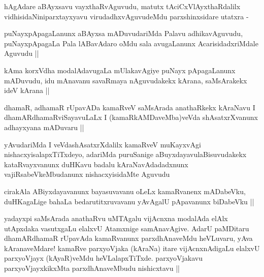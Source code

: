 \begin{artha}
hAgAdare aBAyxsavu vayxthaRvAguvudu, matutx tAciCxVlAyxthaRdalilx
vidhisidaNiniparxtayxyavu virudadhxvAguvudeMdu parxshinxsidare utatxra -
\end{artha}

\begin{artha}
puNayxpApagaLanunx aBAyxsa mADuvudariMda Palavu adhikavAguvudu,
puNayxpApagaLa Pala lABavAdaro oMdu sala avugaLanunx
AcarisidadxriMdale Aguvudu ||
\end{artha}


\begin{artha}
kAma korxVdha modalAdavugaLa mUlakavAgiye puNayx pApagaLanunx
mADuvudu, idu mAnavanu savaRmaya nAguvudakekx kArana, saMsArakekx ideV
kArana ||
\end{artha}


\begin{artha}
dhamaR, adhamaR rUpavADa kamaRveV saMsArada anathaRkekx kAraNavu I
dhamARdhamaRviSayavuLaLx I (kamaRkAMDaveMba)veVda shAsatxrXvanunx
adhayxyana mADuvaru ||
\end{artha}


\begin{artha}
yAvudariMda I veVdashAsatxrXdalilx kamaRveV muKayxvAgi
nishacxyisalapxTiTxdeyo, adariMda puruSanige aBuyxdayavulaBisuvudakekx
kataRvayxvanunx duHKavu badalu kAraNavAdadadxnunx
vajiRsabeVkeMbudanunx nishacxyisidaMte Aguvudu
\end{artha}

\begin{artha}
cirakAla ABiyxdayavanunx bayasuvavanu oLeLx kamaRvanenx mADabeVku,
duHKagaLige bahaLa bedarutitxruvavanu yAvAgalU pApavanunx biDabeVku ||
\end{artha}


\begin{artha}
yadayxpi saMsArada anathaRvu uMTAgalu vijAcnxna modalAda elAlx
utApxdaka vasutxgaLu elalxvU Atamxnige samAnavAgive. AdarU paMDitaru
dhamARdhamaR rUpavAda kamaRvanunx parxdhAnaveMdu heVLuvaru, yAva
kAranaveMdare! kamaRve parxyoVjaka (kAraNa) itare vijAcnxnAdigaLu
elalxvU parxyoVjayx (kAyaR)veMdu heVLalapxTiTxde. parxyoVjakavu
parxyoVjayxkikxMta parxdhAnaveMbudu nishicxtavu ||
\end{artha}

